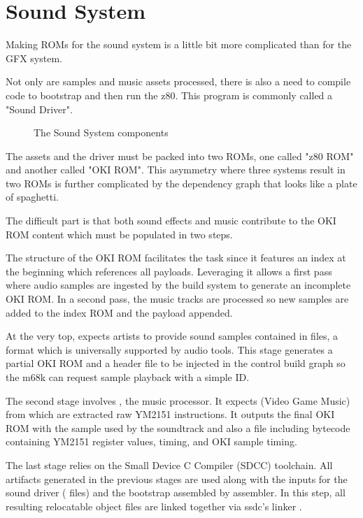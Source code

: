 \chapter{Sound System}
Making ROMs for the sound system is a little bit more complicated than for the GFX system. 

Not only are samples and music assets processed, there is also a need to compile code to bootstrap and then run the z80. This program is commonly called a "Sound Driver".

\begin{figure}[H]
\caption*{The Sound System components}
\end{figure}

The assets and the driver must be packed into two ROMs, one called "z80 ROM" and another called "OKI ROM". This asymmetry where three systems result in two ROMs is further complicated by the dependency graph that looks like a plate of spaghetti. 

The difficult part is that both sound effects and music contribute to the OKI ROM content which must be populated in two steps.




The structure of the OKI ROM facilitates the task since it features an index at the beginning which references all payloads. Leveraging it allows a first pass where audio samples are ingested by the build system to generate an incomplete OKI ROM. In a second pass, the music tracks are processed so new samples are added to the index ROM and the payload appended.

At the very top,  expects artists to provide sound samples contained in  files, a format which is universally supported by audio tools. This stage generates a partial OKI ROM and a  header file to be injected in the control build graph so the m68k can request sample playback with a simple ID.

The second stage involves , the music processor. It expects  (Video Game Music) from which are extracted raw YM2151 instructions. It outputs the final OKI ROM with the sample used by the soundtrack and also a  file including bytecode containing YM2151 register values, timing, and OKI sample timing.

The last stage relies on the Small Device C Compiler (SDCC) toolchain. All artifacts generated in the previous stages are used along with the inputs for the sound driver ( files) and the bootstrap  assembled by  assembler. In this step, all resulting relocatable object files  are linked together via ssdc's linker . 





